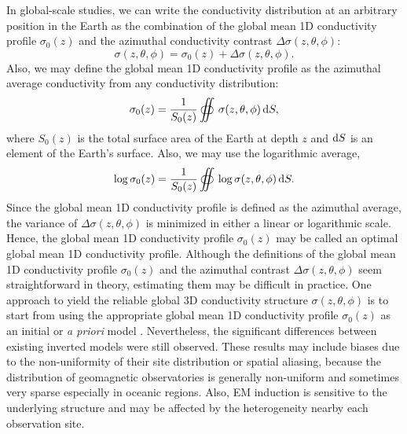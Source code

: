 	In global-scale studies, we can write the conductivity distribution 
	 at an arbitrary position in the Earth as the combination of the global mean 1D conductivity profile $\sigma_0(z)$ and the azimuthal conductivity contrast $\Delta\sigma(z,\theta,\phi)$:
	\begin{equation}\label{eq:global_model}
		\sigma(z,\theta,\phi) = \sigma_0(z) + \Delta\sigma(z,\theta,\phi).
	\end{equation}	
	Also, we may define the global mean 1D conductivity profile as the azimuthal average conductivity from any conductivity distribution:
	\begin{equation}\label{eq:global_mean}
		\sigma_0(z) = \frac{1}{S_0(z)} \oiint\, \sigma(z,\theta,\phi)\, \dwrt{S},
	\end{equation}
	where $S_0(z)$ is the total surface area of the Earth at depth $z$ and $\mathrm{d}{S}$ is an element of the Earth's surface. Also, we may use the logarithmic average,
	\begin{equation}\label{eq:global_mean_log}
		\log \sigma_0(z) = \frac{1}{S_0(z)} \oiint\, \log \sigma(z,\theta,\phi)\, \dwrt{S}.
	\end{equation}
	Since the global mean 1D conductivity profile is defined as the azimuthal average, the variance of $\Delta\sigma(z,\theta,\phi)$ is minimized in either a linear or logarithmic scale. Hence, the global mean 1D conductivity profile $\sigma_0(z)$ may be called an optimal global mean 1D conductivity profile.
	Although the definitions of the global mean 1D conductivity profile $\sigma_0(z)$ and the azimuthal contrast $\Delta\sigma(z,\theta,\phi)$ seem straightforward in theory, estimating them may be difficult in practice. 
	One approach to yield the reliable global 3D conductivity structure $\sigma(z,\theta,\phi)$ is to start from using the appropriate global mean 1D conductivity profile $\sigma_0(z)$ as an initial or \emph{a priori} model \citep[e.g.,][]{kelbert2008a, semenov2012a}.
	Nevertheless, the significant differences between existing inverted models \citep[e.g.,][]{kelbert2009a, kuvshinov2012a, semenov2012a} were still observed. 
	These results may include biases due to the non-uniformity of their site distribution or spatial aliasing, because the distribution of geomagnetic observatories is generally non-uniform and sometimes very sparse especially in oceanic regions. 
	Also, EM induction is sensitive to the underlying structure and may be affected by the heterogeneity nearby each observation site. 	


